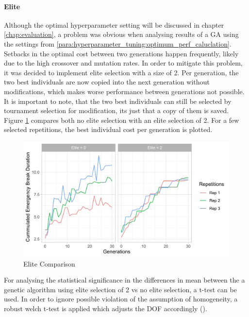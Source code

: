 \paragraph{Elite}
Although the optimal hyperparameter setting will be discussed in chapter \ref{chap:evaluation}, a problem was obvious when analysing results of a GA using the settings from \ref{para:hyperparameter_tuning:optimum_perf_caluclation}. Setbacks in the optimal cost between two generations happen frequently, likely due to the high crossover and mutation rates. In order to mitigate this problem, it was decided to implement elite selection with a size of 2. Per generation, the two best individuals are now copied into the next generation without modifications, which makes worse performance between generations not possible. It is important to note, that the two best individuals can still be selected by tournament selection for modification, its just that a copy of them is saved. Figure \ref{figure:elite_no_elite_comp} compares both no elite selection with an elite selection of 2. For a few selected repetitions, the best individual cost per generation is plotted.

\begin{figure}[ht] 
	\label{figure:elite_no_elite_comp}
	\includegraphics[width=1\linewidth]{simulations/evaluation/plots/elite_vs_no_elite_generations}
	\caption{Elite Comparison}
\end{figure}

For analysing the statistical significance in the differences in mean between the a genetic algorithm using elite selection of 2 vs no elite selection, a t-test can be used. In order to ignore possible violation of the assumption of homogeneity, a robust welch t-test is applied which adjusts the DOF accordingly (\cite{field_discovering_2012}).

